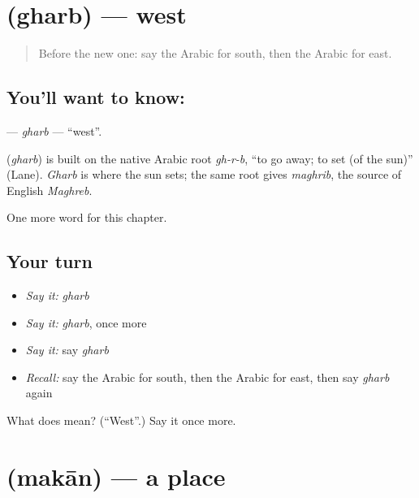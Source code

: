 \section[\texorpdfstring{\ar{غرب} (gharb)}{غرب (gharb)}]{ (gharb) — west}

\label{lesson:AR-C104-gharb}



\begin{quote}
Before the new one: say the Arabic for south, then the Arabic for east.
\end{quote}

\subsection*{You'll want to know: }
\textbf{} — \emph{gharb} — \textquotedblleft{}west\textquotedblright{}.

\begin{cousinweb}
\textbf{} (\emph{gharb}) is built on the native Arabic root \emph{gh-r-b}, \textquotedblleft{}to go away; to set (of the sun)\textquotedblright{} (Lane). \emph{Gharb} is where the sun sets; the same root gives \emph{maghrib}, the source of English \emph{Maghreb}.
\end{cousinweb}

\begin{grammarlens}[title={What you've built}]
One more word for this chapter.
\end{grammarlens}

\subsection*{Your turn}
\begin{itemize}
\raggedright
  \item \emph{Say it:} \emph{gharb}
  \item \emph{Say it:} \emph{gharb}, once more
  \item \emph{Say it:} say \emph{gharb}
  \item \emph{Recall:} say the Arabic for south, then the Arabic for east, then say \emph{gharb} again
\end{itemize}

\begin{tcolorbox}[breakable,colback=teal!4,colframe=teal!35!black,title={Before you move on}]
What does  mean? (\textquotedblleft{}West\textquotedblright{}.) Say it once more.
\end{tcolorbox}
\section[\texorpdfstring{\ar{مكان} (makān)}{مكان (makān)}]{ (makān) — a place}

